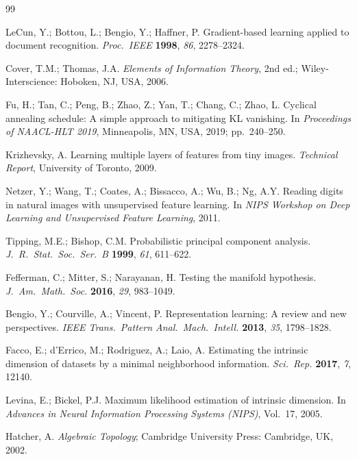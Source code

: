 \documentclass[make,article,submit,pdftex,moreauthors]{Definitions/mdpi}
\begin{document}
\begin{thebibliography}{99}

LeCun, Y.; Bottou, L.; Bengio, Y.; Haffner, P.
Gradient-based learning applied to document recognition.
\textit{Proc.\ IEEE} \textbf{1998}, \textit{86}, 2278--2324.

Cover, T.M.; Thomas, J.A.
\textit{Elements of Information Theory}, 2nd ed.;
Wiley-Interscience: Hoboken, NJ, USA, 2006.

Fu, H.; Tan, C.; Peng, B.; Zhao, Z.; Yan, T.; Chang, C.; Zhao, L.
Cyclical annealing schedule: A simple approach to mitigating {KL} vanishing.
In \textit{Proceedings of NAACL-HLT 2019}, Minneapolis, MN, USA, 2019; pp.~240--250.

Krizhevsky, A.
Learning multiple layers of features from tiny images.
\textit{Technical Report}, University of Toronto, 2009.

Netzer, Y.; Wang, T.; Coates, A.; Bissacco, A.; Wu, B.; Ng, A.Y.
Reading digits in natural images with unsupervised feature learning.
In \textit{NIPS Workshop on Deep Learning and Unsupervised Feature Learning}, 2011.

Tipping, M.E.; Bishop, C.M.
Probabilistic principal component analysis.
\textit{J.~R.~Stat.~Soc.\ Ser.\ B} \textbf{1999}, \textit{61}, 611--622.

Fefferman, C.; Mitter, S.; Narayanan, H.
Testing the manifold hypothesis.
\textit{J.~Am.~Math.~Soc.} \textbf{2016}, \textit{29}, 983--1049.

Bengio, Y.; Courville, A.; Vincent, P.
Representation learning: A review and new perspectives.
\textit{IEEE Trans.~Pattern Anal.~Mach.~Intell.} \textbf{2013}, \textit{35}, 1798--1828.

Facco, E.; d'Errico, M.; Rodriguez, A.; Laio, A.
Estimating the intrinsic dimension of datasets by a minimal neighborhood information.
\textit{Sci.~Rep.} \textbf{2017}, \textit{7}, 12140.

Levina, E.; Bickel, P.J.
Maximum likelihood estimation of intrinsic dimension.
In \textit{Advances in Neural Information Processing Systems (NIPS)}, Vol.~17, 2005.

Hatcher, A. \textit{Algebraic Topology};
Cambridge University Press: Cambridge, UK, 2002.


\end{thebibliography}
\end{document}
